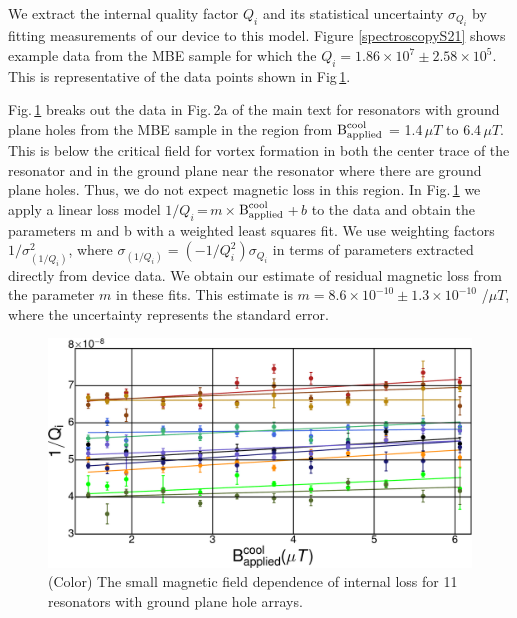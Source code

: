 We extract the internal quality factor $Q_{i}$ and its statistical uncertainty $\sigma_{Q_{i}}$ by fitting measurements of our device to this model.  Figure \ref{spectroscopyS21} shows example data from the MBE sample for which the $Q_{i} = 1.86 \times 10^{7} \pm 2.58 \times 10^{5}$.  This is representative of the data points shown in Fig\,\ref{novortexdata}.

Fig.\,\ref{novortexdata} breaks out the data in Fig.\,2a of the main text for resonators with ground plane holes from the MBE sample in the region from $\text{B}^{\text{cool}}_{\text{applied}}$ = 1.4\,$\mu T$ to 6.4\,$\mu T$.  This is below the critical field for vortex formation in both the center trace of the resonator and in the ground plane near the resonator where there are ground plane holes.  Thus, we do not expect magnetic loss in this region.  In Fig.\,\ref{novortexdata} we apply a linear loss model $1/Q_{i}$\,=\,$m$\,$\times$\,$\text{B}^{\text{cool}}_{\text{applied}}$\,+\,$b$ to the data and obtain the parameters m and b with a weighted least squares fit.  We use weighting factors $1/\sigma^2_{\left( 1/Q_i \right)}$, where $\sigma_{\left( 1/Q_i \right)}=\left( -1/Q_{i}^{2} \right) \sigma_{Q_{i}}$ in terms of parameters extracted directly from device data.  We obtain our estimate of residual magnetic loss from the parameter $m$ in these fits.  This estimate is $m = 8.6\times10^{-10} \pm 1.3\times 10^{-10}$ /$\mu T$, where the uncertainty represents the standard error.


\setlength{\textfloatsep}{0pt}
\begin{figure}
\begin{center}
\includegraphics[width=230 pt]{DielectricFluxTrap_Supp_Rev2_qnovortex.pdf}
\caption{(Color)  The small magnetic field dependence of internal loss for 11 resonators with ground plane hole arrays.}
\label{novortexdata}
\end{center}
\end{figure}


